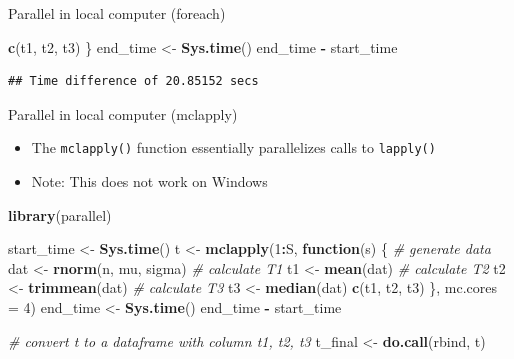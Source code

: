 \documentclass[
  ignorenonframetext,
]{beamer}
\newenvironment{Shaded}{\begin{snugshade}}{\end{snugshade}}
\newcommand{\AttributeTok}[1]{\textcolor[rgb]{0.13,0.29,0.53}{#1}}
\newcommand{\CommentTok}[1]{\textcolor[rgb]{0.56,0.35,0.01}{\textit{#1}}}
\newcommand{\ControlFlowTok}[1]{\textcolor[rgb]{0.13,0.29,0.53}{\textbf{#1}}}
\newcommand{\DecValTok}[1]{\textcolor[rgb]{0.00,0.00,0.81}{#1}}
\newcommand{\FunctionTok}[1]{\textcolor[rgb]{0.13,0.29,0.53}{\textbf{#1}}}
\newcommand{\NormalTok}[1]{#1}
\newcommand{\OtherTok}[1]{\textcolor[rgb]{0.56,0.35,0.01}{#1}}
\newcommand{\SpecialCharTok}[1]{\textcolor[rgb]{0.81,0.36,0.00}{\textbf{#1}}}
\providecommand{\tightlist}{%
  \setlength{\itemsep}{0pt}\setlength{\parskip}{0pt}}
\begin{document}
\begin{frame}[fragile]{Parallel in local computer (foreach)}
\begin{Shaded}
\begin{Highlighting}[]
  \FunctionTok{c}\NormalTok{(t1, t2, t3)}
\NormalTok{\}}
\NormalTok{end\_time }\OtherTok{\textless{}{-}} \FunctionTok{Sys.time}\NormalTok{()}
\NormalTok{end\_time }\SpecialCharTok{{-}}\NormalTok{ start\_time}
\end{Highlighting}
\end{Shaded}

\begin{verbatim}
## Time difference of 20.85152 secs
\end{verbatim}
\end{frame}

\begin{frame}[fragile]{Parallel in local computer (mclapply)}
\protect{}\label{parallel-in-local-computer-mclapply}
\tiny

\begin{itemize}
\tightlist
\item
  The \texttt{mclapply()} function essentially parallelizes calls to
  \texttt{lapply()}
\item
  Note: This does not work on Windows
\end{itemize}

\begin{Shaded}
\begin{Highlighting}[]
\FunctionTok{library}\NormalTok{(parallel)}

\NormalTok{start\_time }\OtherTok{\textless{}{-}} \FunctionTok{Sys.time}\NormalTok{()}
\NormalTok{t }\OtherTok{\textless{}{-}} \FunctionTok{mclapply}\NormalTok{(}\DecValTok{1}\SpecialCharTok{:}\NormalTok{S, }\ControlFlowTok{function}\NormalTok{(s) \{}
  \CommentTok{\# generate data}
\NormalTok{  dat }\OtherTok{\textless{}{-}} \FunctionTok{rnorm}\NormalTok{(n, mu, sigma)}
  \CommentTok{\# calculate T1}
\NormalTok{  t1 }\OtherTok{\textless{}{-}} \FunctionTok{mean}\NormalTok{(dat)}
  \CommentTok{\# calculate T2}
\NormalTok{  t2 }\OtherTok{\textless{}{-}} \FunctionTok{trimmean}\NormalTok{(dat)}
  \CommentTok{\# calculate T3}
\NormalTok{  t3 }\OtherTok{\textless{}{-}} \FunctionTok{median}\NormalTok{(dat)}
  \FunctionTok{c}\NormalTok{(t1, t2, t3)}
\NormalTok{\}, }\AttributeTok{mc.cores =} \DecValTok{4}\NormalTok{)}
\NormalTok{end\_time }\OtherTok{\textless{}{-}} \FunctionTok{Sys.time}\NormalTok{()}
\NormalTok{end\_time }\SpecialCharTok{{-}}\NormalTok{ start\_time}

\CommentTok{\# convert t to a dataframe with column t1, t2, t3}
\NormalTok{t\_final }\OtherTok{\textless{}{-}} \FunctionTok{do.call}\NormalTok{(rbind, t)}
\end{Highlighting}
\end{Shaded}
\end{frame}
\end{document}
